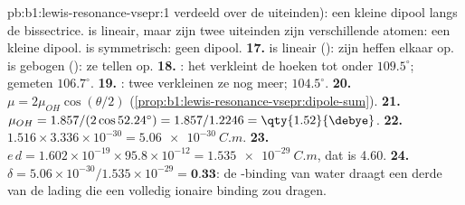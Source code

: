 \begin{solution}{pb:b1:lewis-resonance-vsepr:1}
verdeeld over de uiteinden): een kleine dipool langs de bissectrice.
 is lineair, maar zijn twee uiteinden zijn verschillende atomen:
een kleine dipool.  is symmetrisch: geen dipool.
\textbf{17.}  is lineair (): zijn  heffen
elkaar op.  is gebogen (): ze tellen op.
\textbf{18.} : het  verkleint de hoeken tot onder
$109.5^\circ$; gemeten $106.7^\circ$.
\textbf{19.} : twee  verkleinen ze nog meer;
$104.5^\circ$.
\textbf{20.} $\mu = 2\mu_{OH}\cos(\theta/2)$
(\cref{prop:b1:lewis-resonance-vsepr:dipole-sum}).
\textbf{21.} $\mu_{OH} = 1.857/(2\cos 52.24^\circ) = 1.857/1.2246 =
\qty{1.52}{\debye}$.
\textbf{22.} $1.516 \times 3.336 \times 10^{-30} = \qty{5.06e-30}{C.m}$.
\textbf{23.} $e\,d = 1.602 \times 10^{-19} \times 95.8 \times 10^{-12} =
\qty{1.535e-29}{C.m}$, dat is \qty{4.60}{\debye}.
\textbf{24.} $\delta = 5.06 \times 10^{-30}/1.535 \times 10^{-29} =
\textbf{0.33}$: de -binding van water draagt een derde van de
lading die een volledig ionaire binding zou dragen.
\end{solution}
